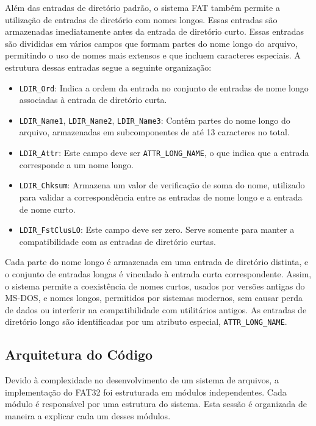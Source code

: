 \documentclass[
    12pt,				%
    oneside,   	        %
    a4paper,			%
    english,			%
    french,				%
    spanish,			%
    brazil,				%
    ]{pacotes/abntex2}
\begin{document}
Além das entradas de diretório padrão, o sistema FAT também permite a utilização de entradas de diretório com nomes longos. Essas entradas são armazenadas imediatamente antes da entrada de diretório curto. Essas entradas são divididas em vários campos que formam partes do nome longo do arquivo, permitindo o uso de nomes mais extensos e que incluem caracteres especiais. A estrutura dessas entradas segue a seguinte organização:

\begin{itemize} 
    \item \texttt{LDIR\_Ord}: Indica a ordem da entrada no conjunto de entradas de nome longo associadas à entrada de diretório curta.
    \item \texttt{LDIR\_Name1}, \texttt{LDIR\_Name2}, \texttt{LDIR\_Name3}: Contêm partes do nome longo do arquivo, armazenadas em subcomponentes de até 13 caracteres no total.
    \item \texttt{LDIR\_Attr}: Este campo deve ser \texttt{ATTR\_LONG\_NAME}, o que indica que a entrada corresponde a um nome longo.
    \item \texttt{LDIR\_Chksum}: Armazena um valor de verificação de soma do nome, utilizado para validar a correspondência entre as entradas de nome longo e a entrada de nome curto.
    \item \texttt{LDIR\_FstClusLO}: Este campo deve ser zero. Serve somente para manter a compatibilidade com as entradas de diretório curtas.
\end{itemize}

Cada parte do nome longo é armazenada em uma entrada de diretório distinta, e o conjunto de entradas longas é vinculado à entrada curta correspondente. Assim, o sistema permite a coexistência de nomes curtos, usados por versões antigas do MS-DOS, e nomes longos, permitidos por sistemas modernos, sem causar perda de dados ou interferir na compatibilidade com utilitários antigos. As entradas de diretório longo são identificadas por um atributo especial, \texttt{ATTR\_LONG\_NAME}.

\subsection{Arquitetura do Código}
\label{subsec:code}

Devido à complexidade no desenvolvimento de um sistema de arquivos, a implementação do FAT32 foi estruturada em módulos independentes. Cada módulo é responsável por uma estrutura do sistema. Esta sessão é organizada de maneira a explicar cada um desses módulos.
\end{document}
